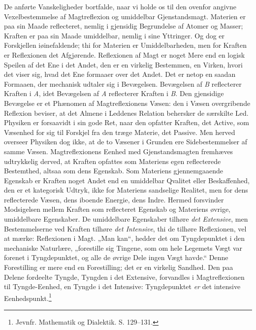 \documentclass[12pt,a4paper]{book}
\begin{document}
De anførte Vanskeligheder bortfalde, naar vi holde os til den ovenfor
angivne Vexelbestemmelse af Magtreflexion og umiddelbar
Gjenstandsmagt. Materien er paa sin Maade reflecteret, nemlig i
gjensidig Begrundelse af Atomer og Masser; Kraften er paa sin Maade
umiddelbar, nemlig i sine Yttringer. Og dog er Forskjellen
iøinefaldende; thi for Materien er Umiddelbarheden, men for Kraften er
Reflexionen det Afgjørende. Reflexionen af Magt er noget Mere end en
logisk Speilen af det Ene i det Andet, den er en virkelig Bestemmen, en
Virken, hvori det viser sig, hvad det Ene formaaer over det Andet. Det
er netop en saadan Formaaen, der mechanisk udtaler sig i Bevægelsen.
Bevægelsen af \textit{B} reflecterer Kraften i \textit{A}, idet
Bevægelsen af \textit{A} reflecterer Kraften i \textit{B}. Den
gjensidige Bevægelse er et Phænomen af Magtreflexionens Væsen: den i
Væsen overgribende Reflexion
beviser, at det Almene i Leddenes Relation behersker de særskilte Led.
Physiken er forsaavidt i sin gode Ret, naar den opfatter Kraften, det
Active, som Væsenhed for sig til Forskjel fra den træge Materie, det
Passive. Men herved overseer Physiken dog ikke, at de to Væsener i
Grunden ere Sidebestemmelser af samme Væsen. Magtreflexionens Eenhed
med Gjenstandsmagten fremhæves udtrykkelig derved, at Kraften opfattes
som Materiens egen reflecterede Bestemthed, altsaa som dens Egenskab.
Som Materiens gjennemgaaende Egenskab er Kraften noget Andet end en
umiddelbar Qvalitet eller Beskaffenhed, den er et kategorisk Udtryk,
ikke for Materiens sandselige Realitet, men for dens reflecterede
Væsen, dens iboende Energie, dens Indre. Hermed forsvinder
Modsigelsen mellem Kraften som reflecteret Egenskab og Materiens
øvrige, umiddelbare Egenskaber. De umiddelbare Egenskaber tilhøre
\emph{det Extensive}, men Bestemmelserne ved Kraften tilhøre \emph{det
Intensive}, thi de tilhøre Reflexionen, vel at mærke: Reflexionen i
Magt. „Man kan“, hedder det om Tyngdepunktet i den mechaniske
Naturlære, „forestille sig Tingene, som om hele Legemets Vægt var
forenet i Tyngdepunktet, og alle de øvrige Dele ingen Vægt havde.“
Denne Forestilling er mere end en Forestilling; det er en virkelig
Sandhed. Den paa Delene fordeelte Tyngde, Tyngden i det Extensive,
forvandles i Magtreflexionen til Tyngde-Eenhed, en Tyngde i det
Intensive: Tyngdepunktet \emph{er} det intensive
Eenhedspunkt.\footnote{%
Jevnfr. Mathematik og Dialektik. S. 129--131.}
\end{document}
